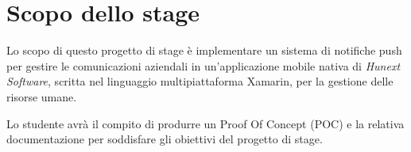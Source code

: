 \section*{Scopo dello stage}

Lo scopo di questo progetto di stage è implementare un sistema di notifiche push per gestire le comunicazioni aziendali in un'applicazione mobile nativa di \textit{Hunext Software}, scritta nel linguaggio multipiattaforma Xamarin, per la gestione delle risorse umane.

Lo studente avrà il compito di produrre un Proof Of Concept (POC) e la relativa documentazione per soddisfare gli obiettivi del progetto di stage.


